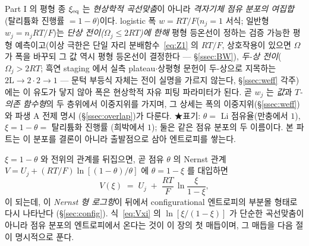 \begin{keybox}
Part I 의 평형 종 $\xi_{\mathrm{eq}}$ 는 \emph{현상학적 곡선맞춤}이 아니라 \emph{격자기체 점유 분포의 여집합}(탈리튬화
진행률 $=1-\theta$)이다. logistic 폭 $w=RT/F$($n_j{=}1$ 서식; 일반형 $w_j=n_jRT/F$)는 \emph{단상
전이($\Omega_j\le2RT$)에 한해} 평형 등온선이 정하는 검증 가능한 평형 예측이고(이상 극한은 단일 자리
분배함수~\eqref{eq:Z1} 의 $RT/F$, 상호작용이 있으면 $\Omega$ 가 폭을 바꾸되 그 값 역시 평형 등온선이
결정한다 --- \S\ref{ssec:BW}), \emph{두-상 전이}($\Omega_j>2RT$; 흑연 staging 에서 실측 plateau$\cdot$상평형
문헌이 두-상으로 지목하는 $2\mathrm L\!\to\!2\cdot2\!\to\!1$ \cite{dahn1991,ohzuku1993} --- 문턱 부등식
자체는 전이 실명을 가르지 않는다, \S\ref{ssec:weff} 각주)에는 이 유도가 닿지 않아 폭은 현상학적 자유 피팅
파라미터가 된다. 곧 $w_j$ 는 \emph{값}과 \emph{$T$-의존
함수형}의 두 층위에서 이중지위를 가지며, 그 상세는 폭의 이중지위(\S\ref{ssec:weff})와 파생 A 전제 명시
(\S\ref{ssec:overlap})가 다룬다. ★표기: $\theta=$ Li 점유율(만충에서 $1$), $\xi=1-\theta=$ 탈리튬화 진행률
(희박에서 $1$); 둘은 같은 점유 분포의 두 이름이다. 본 파트는 이 분포를 결론이 아니라 출발점으로 삼아 엔트로피를
쌓는다.
\end{keybox}

$\xi=1-\theta$ 와 전위의 관계를 뒤집으면, 곧 점유 $\theta$ 의 Nernst 관계
$V=U_j+(RT/F)\ln[(1-\theta)/\theta]$ 에 $\theta=1-\xi$ 를 대입하면
\begin{equation}
V(\xi) \;=\; U_j \;+\; \frac{RT}{F}\,\ln\!\frac{\xi}{1-\xi},
\label{eq:Vxi}
\end{equation}
이 되는데, 이 \emph{Nernst 형 로그항}이 뒤에서 configurational 엔트로피의 부분몰 형태로 다시 나타난다
(\S\ref{sec:config}). 식~\eqref{eq:Vxi} 의 $\ln[\xi/(1-\xi)]$ 가 단순한 곡선맞춤이 아니라 점유 분포의
엔트로피에서 온다는 것이 이 장의 첫 매듭이며, 그 매듭을 다음 절이 명시적으로 푼다.

